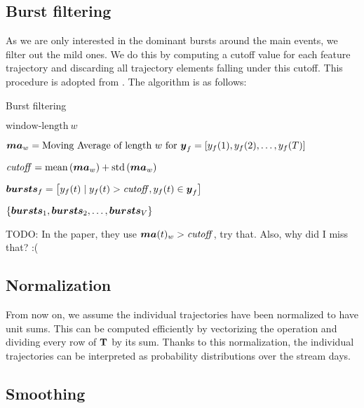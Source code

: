 \subsection{Burst filtering}
As we are only interested in the dominant bursts around the main events, we filter out the mild ones. We do this by computing a cutoff value for each feature trajectory and discarding all trajectory elements falling under this cutoff. This procedure is adopted from \cite{online-search-queries}. The algorithm is as follows:

\begin{algorithm}[H]
\begin{algorithmic}[1]
\caption{Burst filtering}
\Input $\text{window-length} ~ w$

	\State $\vect{MA}_{w} = \text{Moving Average of length} ~ w ~ \text{for} ~ \vect{\traj}_{f} = \left[ \traj_{f}(1), \traj_{f}(2), \dots, \traj_{f}(\streamlen) \right]$

	\State $\mathit{cutoff} = \text{mean} \left( \vect{MA}_{w} \right) + \text{std} \left( \vect{MA}_{w} \right)$

	\State $\vect{bursts}_{f} = \left[ \traj_{f}(t) \mid \traj_{f}(t) > \mathit{cutoff}, \traj_{f}(t) \in \vect{y}_{f} \right]$
\EndFor

\Output $\{ \vect{bursts}_{1}, \vect{bursts}_{2}, \dots, \vect{bursts}_{\featcount} \}$
\end{algorithmic}
\end{algorithm}

{\color{red} TODO: In the paper, they use $\vect{MA}(t)_{w} > \mathit{cutoff}$, try that. Also, why did I miss that? :(}

\subsection{Normalization}
From now on, we assume the individual trajectories have been normalized to have unit sums. This can be computed efficiently by vectorizing the operation and dividing every row of $\mathbf{T}$ by its sum. Thanks to this normalization, the individual trajectories can be interpreted as probability distributions over the stream days.

\subsection{Smoothing}

